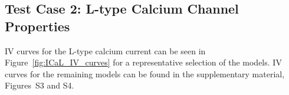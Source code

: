 \documentclass[preprint,authoryear,12pt]{elsarticle}
\newcommand{\changed}[1]{#1}
\begin{document}


\subsection{Test Case 2: L-type Calcium Channel Properties}
\label{sec:results-ical}


IV curves for the L-type calcium current can be seen in Figure~\ref{fig:ICaL_IV_curves} for a representative selection of the models.
IV curves for the remaining models can be found in the supplementary material, Figures~S3 and S4.
\end{document}
